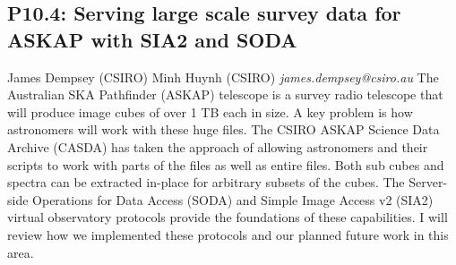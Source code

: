 \documentclass{report}
\begin{document}
\subsection*{P10.4: Serving large scale survey data for ASKAP with SIA2 and SODA}
\bigskip
James Dempsey (CSIRO) \newline Minh Huynh (CSIRO) \newline   \newline   \newline  \newline  \newline\newline
{\it james.dempsey@csiro.au}\newline
\newline\newline
The Australian SKA Pathfinder (ASKAP) telescope is a survey radio telescope that will produce image cubes of over 1 TB each in size. A key problem is how astronomers will work with these huge files. The CSIRO ASKAP Science Data Archive (CASDA) has taken the approach of allowing astronomers and their scripts to work with parts of the files as well as entire files. Both sub cubes and spectra can be extracted in-place for arbitrary subsets of the cubes. The Server-side Operations for Data Access (SODA) and Simple Image Access v2 (SIA2) virtual observatory protocols provide the foundations of these capabilities. I will review how we implemented these protocols and our planned future work in this area.\newline
\newpage
\end{document}
